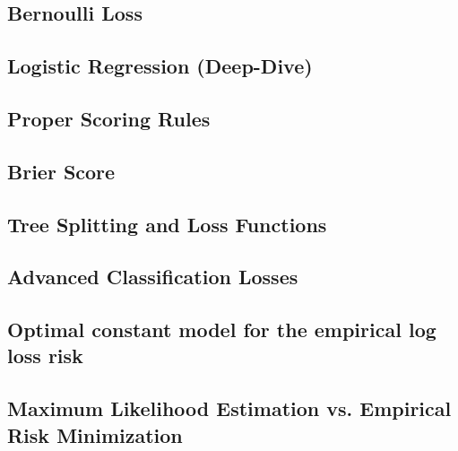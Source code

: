 \subsection{Bernoulli Loss}


\subsection{Logistic Regression (Deep-Dive)}


\subsection{Proper Scoring Rules}


\subsection{Brier Score}


\subsection{Tree Splitting and Loss Functions}


\subsection{Advanced Classification Losses}


\subsection{Optimal constant model for the empirical log loss risk}


\subsection{Maximum Likelihood Estimation vs. Empirical Risk Minimization}


